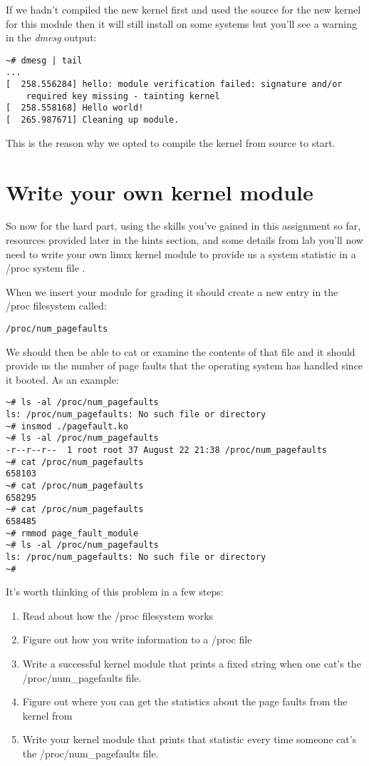 \documentclass[11pt]{article}
\begin{document}
If we hadn't compiled the new kernel first and used the source for the new kernel for this module then it will still install on some systems but you'll see a warning in the {\it dmesg} output:

\begin{verbatim}
~# dmesg | tail
...
[  258.556284] hello: module verification failed: signature and/or  
	required key missing - tainting kernel
[  258.558168] Hello world!
[  265.987671] Cleaning up module.
\end{verbatim}

This is the reason why we opted to compile the kernel from source to start. 

\section*{Write your own kernel module}

So now for the hard part, using the skills you've gained in this assignment so far, resources provided later in the hints section, and some details from lab you'll now need to write your own linux kernel module to provide us a system statistic in a /proc system file \cite{cse551}. 

When we insert your module for grading it should create a new entry in the /proc filesystem called:

\begin{verbatim}
/proc/num_pagefaults
\end{verbatim}

\newpage

We should then be able to cat or examine the contents of that file and it should provide us the number of page faults that the operating system has handled since it booted. As an example:

\begin{verbatim}
~# ls -al /proc/num_pagefaults
ls: /proc/num_pagefaults: No such file or directory
~# insmod ./pagefault.ko 
~# ls -al /proc/num_pagefaults
-r--r--r--  1 root root 37 August 22 21:38 /proc/num_pagefaults
~# cat /proc/num_pagefaults 
658103
~# cat /proc/num_pagefaults 
658295
~# cat /proc/num_pagefaults 
658485
~# rmmod page_fault_module
~# ls -al /proc/num_pagefaults
ls: /proc/num_pagefaults: No such file or directory
~#
\end{verbatim}

It's worth thinking of this problem in a few steps:

\begin{enumerate}
\item Read about how the /proc filesystem works
\item Figure out how you write information to a /proc file
\item Write a successful kernel module that prints a fixed string when one cat's the /proc/num\_pagefaults file. 
\item Figure out where you can get the statistics about the page faults from the kernel from
\item Write your kernel module that prints that statistic every time someone cat's the /proc/num\_pagefaults file.
\end{enumerate}
\end{document}
